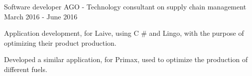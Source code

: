 \begin{cventries}
  \cventry
    {Software developer} %
    {AGO {\normalfont - Technology consultant on supply chain management}} %
    {} %
    {March 2016 - June 2016} %
    {
      \begin{cvitems} %
        \item {Application development, for Laive, using C \# and Lingo, with the purpose of optimizing their product production.}
        \item {Developed a similar application, for Primax, used to optimize the production of different fuels.}
      \end{cvitems}
    }

\end{cventries}
